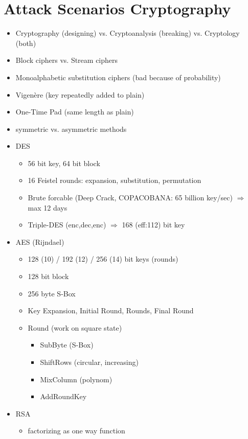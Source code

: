 \documentclass[11pt, paper=a4, twocolumn]{scrartcl}
\begin{document}
	\section{Attack Scenarios Cryptography}
		\begin{itemize}
			\item Cryptography (designing) vs. Cryptoanalysis (breaking) vs. Cryptology (both)
			\item Block ciphers vs. Stream ciphers
			\item Monoalphabetic substitution ciphers (bad because of probability)
			\item Vigenère (key repeatedly added to plain)
			\item One-Time Pad (same length as plain)
			\item symmetric vs. asymmetric methods
			\item DES
				\begin{itemize}
					\item 56 bit key, 64 bit block
					\item 16 Feistel rounds: expansion, substitution, permutation
					\item Brute forcable (Deep Crack, COPACOBANA: 65 billion key/sec) $\Rightarrow$ max 12 days
					\item Triple-DES (enc,dec,enc) $\Rightarrow$ 168 (eff:112) bit key
				\end{itemize}
			\item AES (Rijndael)
				\begin{itemize}
					\item 128 (10) / 192 (12) / 256 (14) bit keys (rounds)
					\item 128 bit block
					\item 256 byte S-Box
					\item Key Expansion, Initial Round, Rounds, Final Round
					\item Round (work on square state)
						\begin{itemize}
							\item SubByte (S-Box)
							\item ShiftRows (circular, increasing)
							\item MixColumn (polynom)
							\item AddRoundKey
						\end{itemize}
				\end{itemize}
			\item RSA
				\begin{itemize}
					\item factorizing as one way function

\end{itemize}
\end{itemize}
\end{document}
